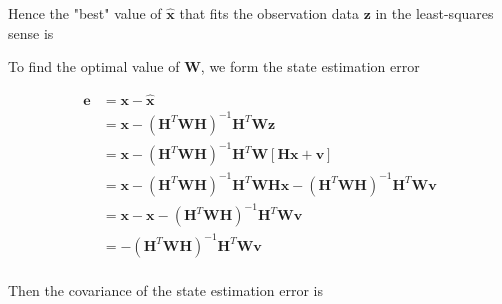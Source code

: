 \documentclass[12pt]{article}
\begin{document}
Hence the "best" value of $\hat{\mathbf{x}}$ that fits the observation data $\mathbf{z}$
in the least-squares sense is


To find the optimal value of $\mathbf{W}$, we form the state estimation error

\begin{equation*}
    \begin{aligned}
        \mathbf{e} &= \mathbf{x} - \hat{\mathbf{x}} \\
        &= \mathbf{x} - \left( \mathbf{H}^T \mathbf{W} \mathbf{H} \right)^{-1} \mathbf{H}^T \mathbf{W} \mathbf{z} \\
        &= \mathbf{x} - \left( \mathbf{H}^T \mathbf{W} \mathbf{H} \right)^{-1} \mathbf{H}^T \mathbf{W} \left[ \mathbf{H} \mathbf{x} + \mathbf{v} \right] \\
        &= \mathbf{x}
           - \left( \mathbf{H}^T \mathbf{W} \mathbf{H} \right)^{-1} \mathbf{H}^T \mathbf{W} \mathbf{H} \mathbf{x}
           - \left( \mathbf{H}^T \mathbf{W} \mathbf{H} \right)^{-1} \mathbf{H}^T \mathbf{W} \mathbf{v} \\
        &= \mathbf{x} - \mathbf{x}
           - \left( \mathbf{H}^T \mathbf{W} \mathbf{H} \right)^{-1} \mathbf{H}^T \mathbf{W} \mathbf{v} \\
        &= - \left( \mathbf{H}^T \mathbf{W} \mathbf{H} \right)^{-1} \mathbf{H}^T \mathbf{W} \mathbf{v} \\
    \end{aligned}
\end{equation*}

Then the covariance of the state estimation error is
\end{document}
